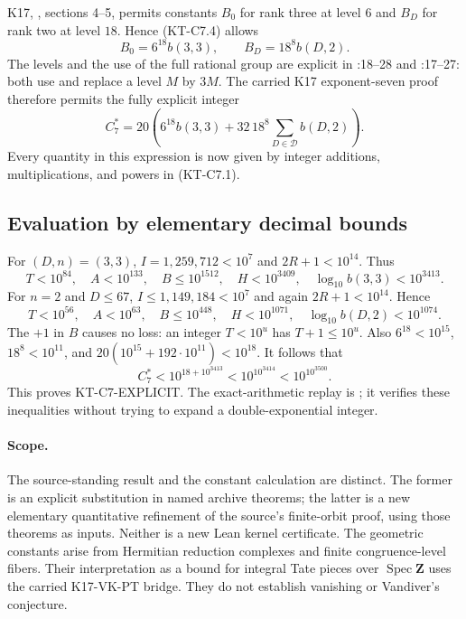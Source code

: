 K17, ,
sections 4--5, permits constants $B_0$ for rank three at level $6$
and $B_D$ for rank two at level $18$.  Hence (KT-C7.4) allows
\[
 B_0=6^{18}b(3,3),\qquad B_D=18^8b(D,2).
\tag{KT-C7.5}
\]
The levels and the use of the full rational group are explicit in
:18--28
and :17--27:
both use  and replace a level $M$ by
$3M$.  The carried K17 exponent-seven proof therefore permits the
fully explicit integer
\[
 C_7^*=20\left(6^{18}b(3,3)+32\,18^8
                 \sum_{D\in\mathcal D}b(D,2)\right).
\tag{KT-C7.6}
\]
Every quantity in this expression is now given by integer additions,
multiplications, and powers in (KT-C7.1).

\subsection{Evaluation by elementary decimal bounds}

For $(D,n)=(3,3)$, $I=1{,}259{,}712<10^7$ and $2R+1<10^{14}$.
Thus
\[
 T<10^{84},\quad A<10^{133},\quad B\le10^{1512},
 \quad H<10^{3409},\quad \log_{10}b(3,3)<10^{3413}.
\]
For $n=2$ and $D\le67$, $I\le1{,}149{,}184<10^7$ and again
$2R+1<10^{14}$.  Hence
\[
 T<10^{56},\quad A<10^{63},\quad B\le10^{448},
 \quad H<10^{1071},\quad \log_{10}b(D,2)<10^{1074}.
\]
The $+1$ in $B$ causes no loss: an integer $T<10^u$ has
$T+1\le10^u$.
Also $6^{18}<10^{15}$, $18^8<10^{11}$, and
$20(10^{15}+192\cdot10^{11})<10^{18}$.
It follows that
\[
 C_7^*<10^{18+10^{3413}}<10^{10^{3414}}<10^{10^{3500}}.
\]
This proves KT-C7-EXPLICIT.  The exact-arithmetic replay is
; it verifies these inequalities without
trying to expand a double-exponential integer.

\paragraph{Scope.}
The source-standing result and the constant calculation are distinct.
The former is an explicit substitution in named archive theorems;
the latter is a new elementary quantitative refinement of the source's
finite-orbit proof, using those theorems as inputs.  Neither is a new
Lean kernel certificate.  The geometric constants arise from
Hermitian reduction complexes and finite congruence-level fibers.
Their interpretation as a bound for integral Tate pieces over
$\operatorname{Spec}\mathbf Z$ uses the carried K17-VK-PT bridge.
They do not establish vanishing or Vandiver's conjecture.
